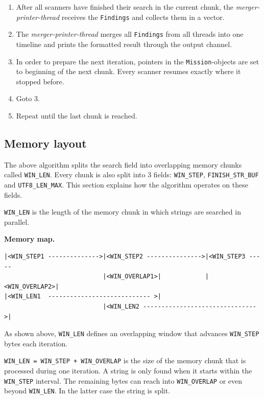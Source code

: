 \begin{enumerate}
  marker in its \texttt{Mission}-object pointing to the exact byte where
  it has stopped scanning. Besides this marker, the scanner is
  \emph{stateless}. Finally, the scanner pauses and waits for the next
  memory chunk and mission.
\item
  After all scanners have finished their search in the current chunk,
  the \emph{merger-printer-thread} receives the \texttt{Findings} and
  collects them in a vector.
\item
  The \emph{merger-printer-thread} merges all \texttt{Findings} from all
  threads into one timeline and prints the formatted result through the
  output channel.
\item
  In order to prepare the next iteration, pointers in the
  \texttt{Mission}-objects are set to beginning of the next chunk. Every
  scanner resumes exactly where it stopped before.
\item
  Goto 3.
\item
  Repeat until the last chunk is reached.
\end{enumerate}

\subsection{Memory layout}\label{_memory_layout}

The above algorithm splits the search field into overlapping memory
chunks called \texttt{WIN\_LEN}. Every chunk is also split into 3
fields: \texttt{WIN\_STEP}, \texttt{FINISH\_STR\_BUF} and
\texttt{UTF8\_LEN\_MAX}. This section explains how the algorithm
operates on these fields.

\texttt{WIN\_LEN} is the length of the memory chunk in which strings are
searched in parallel.

\textbf{Memory map.}

\begin{verbatim}
|<WIN_STEP1 -------------->|<WIN_STEP2 --------------->|<WIN_STEP3 -----
                           |<WIN_OVERLAP1>|            |<WIN_OVERLAP2>|
|<WIN_LEN1  ---------------------------- >|
                           |<WIN_LEN2 ------------------------------->|
\end{verbatim}

As shown above, \texttt{WIN\_LEN} defines an overlapping window that
advances \texttt{WIN\_STEP} bytes each iteration.

\texttt{WIN\_LEN\ =\ WIN\_STEP\ +\ WIN\_OVERLAP} is the size of the
memory chunk that is processed during one iteration. A string is only
found when it starts within the \texttt{WIN\_STEP} interval. The
remaining bytes can reach into \texttt{WIN\_OVERLAP} or even beyond
\texttt{WIN\_LEN}. In the latter case the string is split.

